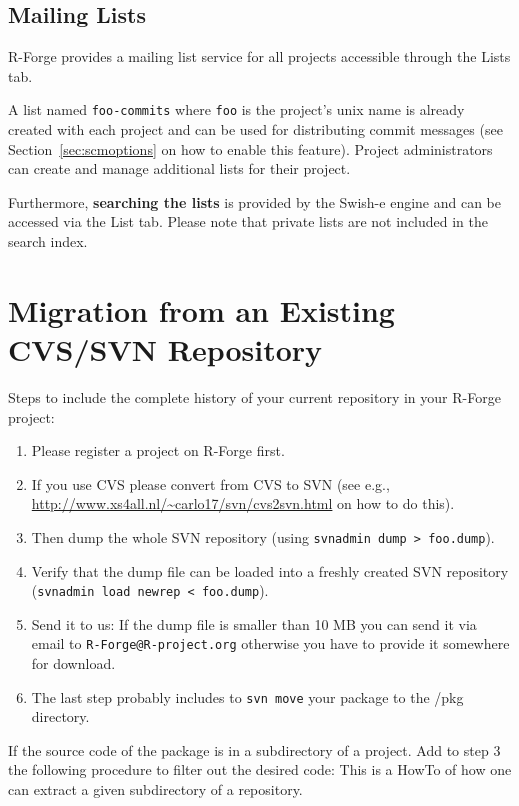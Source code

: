 \documentclass[a4paper]{article}
\let\code=\texttt
\let\email=\texttt
\begin{document}
\subsection{Mailing Lists}
R-Forge provides a mailing list service for all projects accessible
through the Lists tab.  

A list named \texttt{foo-commits} where \texttt{foo} is the
project's unix name is already created with each project and can be
used for distributing commit messages (see
Section~\ref{sec:scmoptions}  on how to enable
this feature). Project administrators can create and manage additional
lists for their project.  

Furthermore, \textbf{searching the lists} is provided by the Swish-e engine
and can be accessed via the List tab. Please note that private lists
are not included in the search index.  


\section{Migration from an Existing CVS/SVN Repository}
\label{sec:svnmigration}

Steps to include the complete history of your current repository in
your R-Forge project:
\begin{enumerate}
\item Please register a project on R-Forge first.
\item If you use CVS please convert from CVS to SVN (see e.g.,
  \url{http://www.xs4all.nl/~carlo17/svn/cvs2svn.html} on how to do
  this).
\item Then dump the whole SVN repository (using \code{svnadmin dump >
    foo.dump}).
\item Verify that the dump file can be loaded into a freshly created
  SVN repository (\code{svnadmin load newrep < foo.dump}). 
\item Send it to us: If the dump file is smaller than 10 MB you can
  send it via email to \email{R-Forge@R-project.org} otherwise you have to
  provide it somewhere for download. 
\item The last step probably includes to \code{svn move} your package
  to the /pkg directory.
\end{enumerate}


If the source code of the package is in a subdirectory of a
project. Add to step 3 the following procedure to filter out the
desired code:
This is a HowTo of how one can extract a given subdirectory of a
repository.
\end{document}

